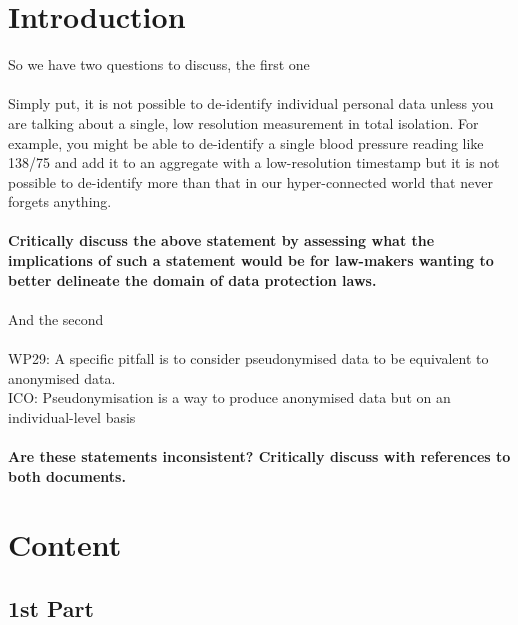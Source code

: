 \documentclass[12pt]{article} %
\begin{document}




\section{Introduction} %
So we have two questions to discuss, the first one\\\\Simply put, it is not possible to de-identify individual personal data unless you are talking about a single, low resolution measurement in total isolation. For example, you might be able to de-identify a single blood pressure reading like 138/75 and add it to an aggregate with a low-resolution timestamp but it is not possible to de-identify more than that in our hyper-connected world that never forgets anything.\\\\
\textbf{Critically discuss the above statement by assessing what the implications of such a statement would be for law-makers wanting to better delineate the domain of data protection laws.}\\\\
And the second\\\\
WP29: A specific  pitfall  is  to consider pseudonymised  data  to  be  equivalent to anonymised  data.\\ICO:  Pseudonymisation is a way to produce anonymised data but on an individual-level basis\\\\
\textbf{Are these statements inconsistent? Critically discuss with references to both documents. }



\section{Content}
\subsection{1st Part}
\end{document}
